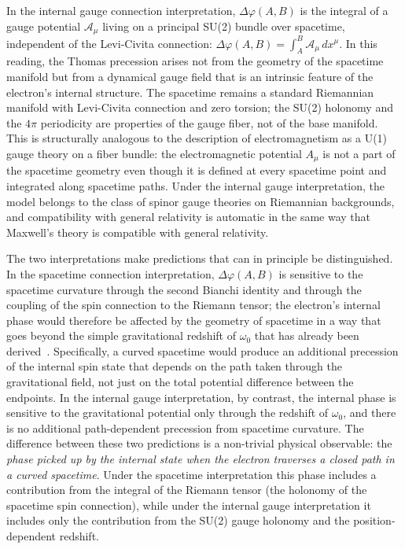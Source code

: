 \documentclass[%
 reprint,
 amsmath,amssymb,
 aps,
 prb,
]{revtex4-2}
\numberwithin{equation}{section}
\begin{document}
In the internal gauge connection interpretation, $\Delta\varphi(A,B)$ is the integral of a gauge potential $\mathcal{A}_\mu$ living on a principal SU(2) bundle over spacetime, independent of the Levi-Civita connection: $\Delta\varphi(A,B) = \int_A^B \mathcal{A}_\mu\,dx^\mu$. In this reading, the Thomas precession arises not from the geometry of the spacetime manifold but from a dynamical gauge field that is an intrinsic feature of the electron's internal structure. The spacetime remains a standard Riemannian manifold with Levi-Civita connection and zero torsion; the SU(2) holonomy and the $4\pi$ periodicity are properties of the gauge fiber, not of the base manifold. This is structurally analogous to the description of electromagnetism as a U(1) gauge theory on a fiber bundle: the electromagnetic potential $A_\mu$ is not a part of the spacetime geometry even though it is defined at every spacetime point and integrated along spacetime paths. Under the internal gauge interpretation, the model belongs to the class of spinor gauge theories on Riemannian backgrounds, and compatibility with general relativity is automatic in the same way that Maxwell's theory is compatible with general relativity.

The two interpretations make predictions that can in principle be distinguished. In the spacetime connection interpretation, $\Delta\varphi(A,B)$ is sensitive to the spacetime curvature through the second Bianchi identity and through the coupling of the spin connection to the Riemann tensor; the electron's internal phase would therefore be affected by the geometry of spacetime in a way that goes beyond the simple gravitational redshift of $\omega_0$ that has already been derived~\cite{paper22}. Specifically, a curved spacetime would produce an additional precession of the internal spin state that depends on the path taken through the gravitational field, not just on the total potential difference between the endpoints. In the internal gauge interpretation, by contrast, the internal phase is sensitive to the gravitational potential only through the redshift of $\omega_0$, and there is no additional path-dependent precession from spacetime curvature. The difference between these two predictions is a non-trivial physical observable: the \emph{phase picked up by the internal state when the electron traverses a closed path in a curved spacetime}. Under the spacetime interpretation this phase includes a contribution from the integral of the Riemann tensor (the holonomy of the spacetime spin connection), while under the internal gauge interpretation it includes only the contribution from the SU(2) gauge holonomy and the position-dependent redshift.
\end{document}
